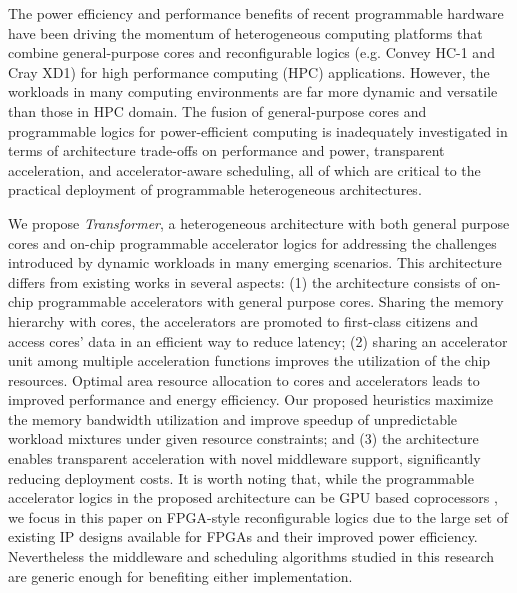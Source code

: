 The power efficiency \cite{hamada09,thomas09} and performance benefits
of recent programmable hardware have been driving the momentum of
heterogeneous computing platforms that combine general-purpose cores
and reconfigurable logics (e.g. Convey HC-1 \cite{brewer09} and Cray
XD1\cite{Ulmer:2005vh}) for high performance computing (HPC)
applications. However, the workloads in many computing environments
are far more dynamic and versatile than those in HPC domain. The
fusion of general-purpose cores and programmable logics for
power-efficient computing is inadequately investigated in terms of
architecture trade-offs on performance and power, transparent
acceleration, and accelerator-aware scheduling, all of which are
critical to the practical deployment of programmable heterogeneous
architectures.

We propose {\em Transformer}, a heterogeneous architecture with both
general purpose cores and on-chip programmable accelerator logics for
addressing the challenges introduced by dynamic workloads in many
emerging scenarios. This architecture differs from existing works in
several aspects: (1) the architecture consists of on-chip programmable
accelerators with general purpose cores.  Sharing the memory hierarchy
with cores, the accelerators are promoted to first-class citizens and
access cores' data in an efficient way to reduce latency;  
(2) sharing an accelerator unit among multiple acceleration functions
improves the utilization of the chip resources. Optimal area resource
allocation to cores and accelerators leads to improved performance and
energy efficiency. Our proposed heuristics maximize the memory
bandwidth utilization and improve speedup of unpredictable workload
mixtures under given resource constraints; and (3) the architecture
enables transparent acceleration with novel middleware support,
significantly reducing deployment costs.  It is worth noting that,
while the programmable accelerator logics in the proposed architecture
can be GPU based coprocessors \cite{intel-gpu}, we focus in this paper
on FPGA-style reconfigurable logics due to the large set of existing IP
designs available for FPGAs and their improved power
efficiency. Nevertheless the middleware and scheduling algorithms
studied in this research are generic enough for benefiting either
implementation.

